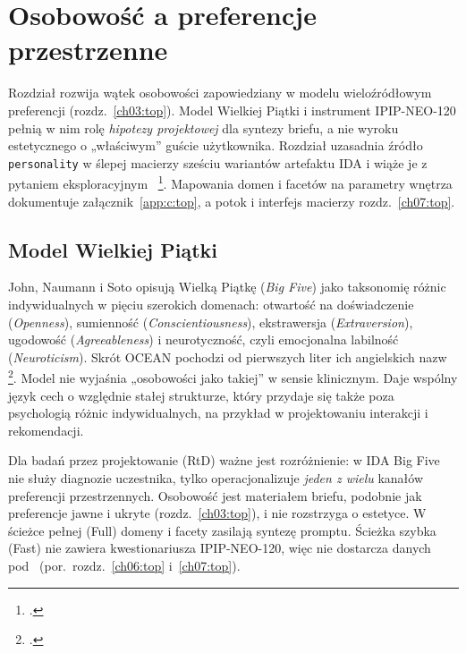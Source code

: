 \chapter{Osobowość a preferencje przestrzenne}
\label{ch05:top}

Rozdział rozwija wątek osobowości zapowiedziany w modelu wieloźródłowym preferencji (rozdz.~\ref{ch03:top}). Model Wielkiej Piątki i instrument IPIP-NEO-120 pełnią w nim rolę \emph{hipotezy projektowej} dla syntezy briefu, a nie wyroku estetycznego o „właściwym” guście użytkownika.
Rozdział uzasadnia źródło \texttt{personality} w ślepej macierzy sześciu wariantów artefaktu IDA i wiąże je z pytaniem eksploracyjnym~ \footcite{idaPlatform2026}.
Mapowania domen i facetów na parametry wnętrza dokumentuje załącznik~\ref{app:c:top}, a potok i interfejs macierzy rozdz.~\ref{ch07:top}.

\section{Model Wielkiej Piątki}
\label{ch05:sec:bigfive}

John, Naumann i Soto opisują Wielką Piątkę (\emph{Big Five}) jako taksonomię różnic indywidualnych w pięciu szerokich domenach: otwartość na doświadczenie (\emph{Openness}), sumienność (\emph{Conscientiousness}), ekstrawersja (\emph{Extraversion}), ugodowość (\emph{Agreeableness}) i neurotyczność, czyli emocjonalna labilność (\emph{Neuroticism}). Skrót OCEAN pochodzi od pierwszych liter ich angielskich nazw \footcite{john2008bigfive}.
Model nie wyjaśnia „osobowości jako takiej” w sensie klinicznym. Daje wspólny język cech o względnie stałej strukturze, który przydaje się także poza psychologią różnic indywidualnych, na przykład w projektowaniu interakcji i rekomendacji.

Dla badań przez projektowanie (RtD) ważne jest rozróżnienie: w IDA Big Five nie służy diagnozie uczestnika, tylko operacjonalizuje \emph{jeden z wielu} kanałów preferencji przestrzennych.
Osobowość jest materiałem briefu, podobnie jak preferencje jawne i ukryte (rozdz.~\ref{ch03:top}), i nie rozstrzyga o estetyce.
W ścieżce pełnej (Full) domeny i facety zasilają syntezę promptu. Ścieżka szybka (Fast) nie zawiera kwestionariusza IPIP-NEO-120, więc nie dostarcza danych pod~ (por.\ rozdz.~\ref{ch06:top} i~\ref{ch07:top}).

